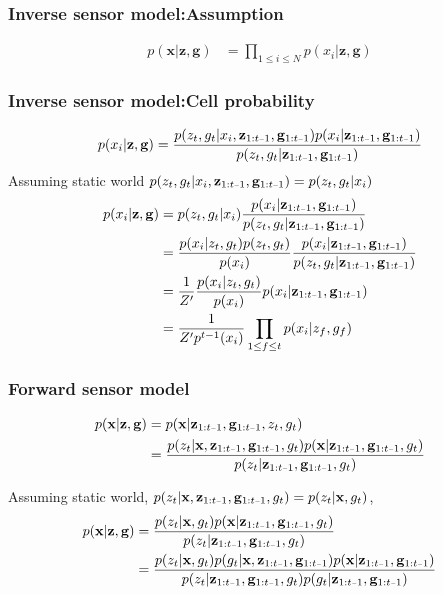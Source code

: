 \documentclass{beamer}
\newcommand{\vect}[1]{\mathbf{#1}}
\newcommand{\map}{\vect{x}}
\newcommand{\meas}{z}
\newcommand{\measurements}{\vect{\meas}}
\newcommand{\pose}{g}
\newcommand{\poses}{\vect{\pose}}
\newcommand{\unaryminus}{\scalebox{0.5}[0.5]{\( - \)}}
\newcommand{\prevtime}{1:t\unaryminus1}
\newcommand{\remaining}{\measurements_{\prevtime}, \poses_{\prevtime}}
\begin{document}
\begin{frame}
  \frametitle{Inverse sensor model:Assumption}
  \begin{align}
    p(\map|\measurements, \poses) &= \prod_{1 \le i \le N} p(x_i|\measurements, \poses)
  \end{align}
\end{frame}
\begin{frame}
  \frametitle{Inverse sensor model:Cell probability}
  \begin{align}
    p(x_i|\measurements, \poses) &= \frac{p(\meas_t, \pose_t|x_i, \remaining)p(x_i|\remaining)}
    {p(\meas_t, \pose_t|\remaining)}\\
  \end{align}
  Assuming static world $p(z_t, g_t|x_i, \remaining) = p(z_t, g_t|x_i)$
  \begin{align}
    p(x_i|\measurements, \poses) 
    &= p(\meas_t, \pose_t|x_i)\frac{p(x_i|\remaining)} {p(\meas_t, \pose_t|\remaining)}\\
    &= \frac{p(x_i|\meas_t, \pose_t)p(\meas_t,\pose_t)} {p(x_i)}\frac{p(x_i|\remaining)}{p(\meas_t, \pose_t|\remaining)}\\
    &= \frac{1}{Z'}\frac{p(x_i|\meas_t, \pose_t)}{p(x_i)}p(x_i|\remaining)\\
    &= \frac{1}{Z'p^{t-1}(x_i)}\prod_{1\le f \le t} p(x_i|\meas_f, \pose_f)
    \label{eq:assumeindependence}
  \end{align}
\end{frame}

\begin{frame}
  \frametitle{Forward sensor model}
  \begin{align}
    p(\map | \measurements, \poses) &= p(\map | \remaining, z_t, g_t)\\
                                    &= \frac{p(z_t|\map , \remaining, g_t)p(\map| \remaining, g_t)}
    {p(z_t|\remaining, g_t)}
    \label{eq:recursivesol}
  \end{align}

  Assuming static world, $p(\meas_t|\map, \remaining, \pose_t) = p(\meas_t|\map, \pose_t)$, 
  \begin{align}
    p(\map|\measurements, \poses) &= \frac{p(\meas_t|\map, \pose_t)p(\map| \remaining, \pose_t)}
    {p(\meas_t|\remaining, \pose_t)}\\
    &= \frac{p(\meas_t|\map, \pose_t)p(\pose_t|\map, \remaining)p(\map| \remaining)}
    {p(\meas_t|\remaining, \pose_t)p(\pose_t|\remaining)}
  \end{align}
\end{frame}
\end{document}
